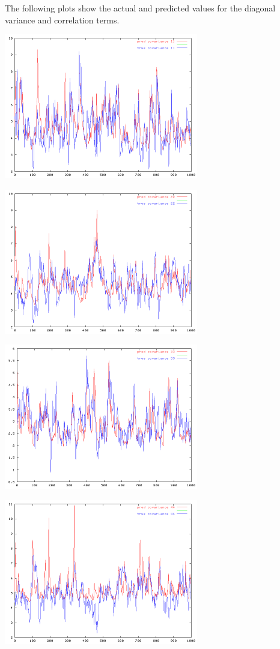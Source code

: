 {The following plots show the actual and predicted values for the diagonal variance and
correlation terms. %

\includegraphics[height=2.5in, width=\textwidth]{example/covarplot11.png}

\includegraphics[height=2.5in, width=\textwidth]{example/covarplot22.png}

\includegraphics[height=2.5in, width=\textwidth]{example/covarplot33.png}


\includegraphics[height=2.5in, width=\textwidth]{example/covarplot44.png}

}
